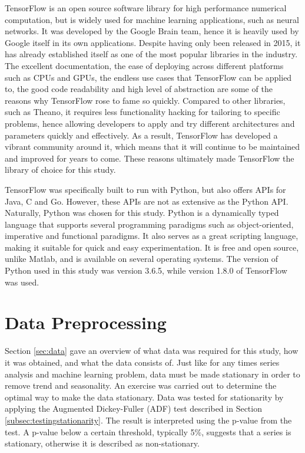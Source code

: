 \documentclass{UoYCSproject}
\begin{document}
TensorFlow is an open source software library for high performance numerical computation, but is widely used for machine learning applications, such as neural networks. It was developed by the Google Brain team, hence it is heavily used by Google itself in its own applications. Despite having only been released in 2015, it has already established itself as one of the most popular libraries in the industry. The excellent documentation, the ease of deploying across different platforms such as CPUs and GPUs, the endless use cases that TensorFlow can be applied to, the good code readability and high level of abstraction are some of the reasons why TensorFlow rose to fame so quickly. Compared to other libraries, such as Theano, it requires less functionality hacking for tailoring to specific problems, hence allowing developers to apply and try different architectures and parameters quickly and effectively. As a result, TensorFlow has developed a vibrant community around it, which means that it will continue to be maintained and improved for years to come. These reasons ultimately made TensorFlow the library of choice for this study.         

TensorFlow was specifically built to run with Python, but also offers APIs for Java, C and Go. However, these APIs are not as extensive as the Python API. Naturally, Python was chosen for this study. Python is a dynamically typed language that supports several programming paradigms such as object-oriented, imperative and functional paradigms. It also serves as a great scripting language, making it suitable for quick and easy experimentation. It is free and open source, unlike Matlab, and is available on several operating systems. The version of Python used in this study was version 3.6.5, while version 1.8.0 of TensorFlow was used.

\section{Data Preprocessing}
\label{sec:datapreprocessing}
Section \ref{sec:data} gave an overview of what data was required for this study, how it was obtained, and what the data consists of. Just like for any times series analysis and machine learning problem, data must be made stationary in order to remove trend and seasonality. An exercise was carried out to determine the optimal way to make the data stationary. Data was tested for stationarity by applying the Augmented Dickey-Fuller (ADF) test described in Section \ref{subsec:testingstationarity}. The result is interpreted using the p-value from the test. A p-value below a certain threshold, typically 5\%, suggests that a series is stationary, otherwise it is described as non-stationary. 
\end{document}
